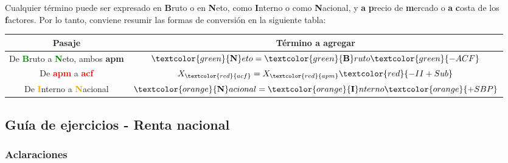 \documentclass[12pt,a4paper]{article}
\begin{document}
    	\par{
        	Cualquier término puede ser expresado en \textbf{B}ruto o en \textbf{N}eto, como \textbf{I}nterno o como \textbf{N}acional, y \textbf{a} \textbf{p}recio de \textbf{m}ercado o \textbf{a} \textbf{c}osta de los \textbf{f}actores.
            Por lo tanto, conviene resumir las formas de conversión en la siguiente tabla:
        	}
            
        \begin{table}[H]
		\centering
        	\begin{tabular}{ | c | c | }
            	\hline
				Pasaje & Término a agregar\\ \hline
                
                De \textcolor{green}{\textbf{B}}ruto a \textcolor{green}{\textbf{N}}eto, ambos \textbf{apm} & $ \textcolor{green}{\textbf{N}}eto = \textcolor{green}{\textbf{B}}ruto   \textcolor{green}{ - ACF} $ \\ \hline
                
                De \textcolor{red}{\textbf{apm}} a \textcolor{red}{\textbf{acf}} & $ X_{\textcolor{red}{acf}} = X_{\textcolor{red}{apm}} \textcolor{red}{ - II + Sub} $ \\ \hline
                
                De \textcolor{orange}{\textbf{I}}nterno a \textcolor{orange}{\textbf{N}}acional & $ \textcolor{orange}{\textbf{N}}acional = \textcolor{orange}{\textbf{I}}nterno \textcolor{orange}{ + SBP} $ \\ \hline
            \end{tabular}
		\end{table}
        
    
    \newpage
    
    \subsection{Guía de ejercicios - Renta nacional}
    
    
    	\subsubsection{Aclaraciones}
        
\end{document}

